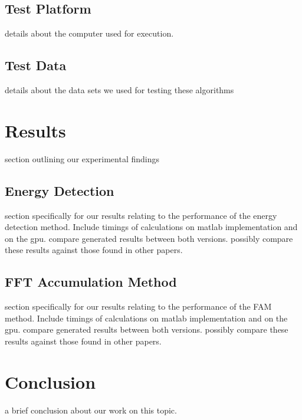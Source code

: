 \subsection{Test Platform}
details about the computer used for execution.

\subsection{Test Data}
details about the data sets we used for testing these algorithms



\section{Results}
section outlining our experimental findings

\subsection{Energy Detection}
\label{sect:energy_detect_result}
section specifically for our results relating to the performance of the energy detection method.  Include timings of calculations on matlab implementation and on the gpu.  compare generated results between both versions.  possibly compare these results against those found in other papers.

\subsection{FFT Accumulation Method}
\label{sect:FAM_result}
section specifically for our results relating to the performance of the FAM method.  Include timings of calculations on matlab implementation and on the gpu.  compare generated results between both versions.  possibly compare these results against those found in other papers.

\section{Conclusion}
a brief conclusion about our work on this topic.
